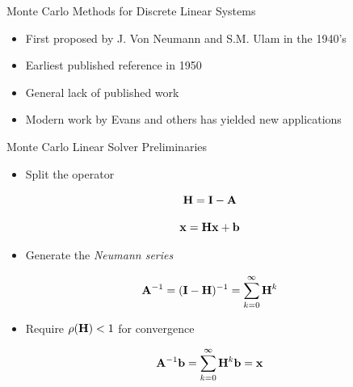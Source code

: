 \documentclass{beamer}
\begin{document}
\begin{frame}{Monte Carlo Methods for Discrete Linear Systems}

  \begin{itemize}
  \item First proposed by J. Von Neumann and S.M. Ulam in the 1940's
    \medskip \medskip
  \item Earliest published reference in 1950
    \medskip \medskip
  \item General lack of published work
    \medskip \medskip
  \item Modern work by Evans and others has yielded new applications
  \end{itemize}
\end{frame}

\begin{frame}{Monte Carlo Linear Solver Preliminaries}

  \begin{itemize}
  \item Split the operator
  \end{itemize}

  \[
  \mathbf{H} = \mathbf{I} - \mathbf{A}
  \]

  \[
  \mathbf{x} = \mathbf{H} \mathbf{x} + \mathbf{b}
  \]

  \medskip
  \begin{itemize}
  \item Generate the \textit{Neumann series}
  \end{itemize}
  
  \[
  \mathbf{A}^{-1} = (\mathbf{I}-\mathbf{H})^{-1} = \sum_{k=0}^{\infty} \mathbf{H}^k
  \]

  \medskip
  \begin{itemize}
  \item Require $\rho(\mathbf{H}) < 1$ for convergence
  \end{itemize}

  \[
  \mathbf{A}^{-1}\mathbf{b} = \sum_{k=0}^{\infty} \mathbf{H}^k\mathbf{b} = \mathbf{x}
  \]

\end{frame}
\end{document}
